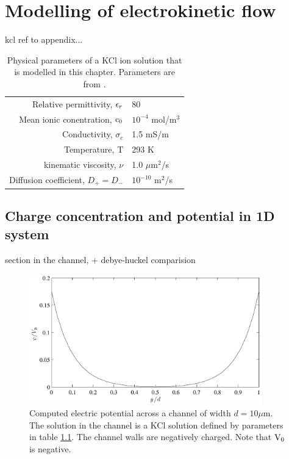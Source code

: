\chapter{Modelling of electrokinetic flow}
kcl ref to appendix...
\begin{table}
  \caption{Physical parameters of a KCl ion solution that is modelled
    in this chapter. Parameters are from \cite{dongquing-ren-book}. }
\begin{center}
    \begin{tabular}{ | r | l |}
    \hline
    Relative permittivity, $\epsilon_r$ & 80\\
    Mean ionic conentration, $\mathrm{c_0}$ & $10^{-4}$ mol/m$^3$\\
    Conductivity, $\sigma_c$ & 1.5 mS/m\\
    Temperature, T & 293 K\\
    kinematic viscosity, $\nu$ & 1.0 $\mu$m$^2$/s\\
    Diffusion coefficient, $D_+ = D_{-}$ & $ 10^{-10}$ m$^2$/s\\
    \hline
    \end{tabular}
\end{center}    
\label{tab:res:param}
\end{table}

\section{Charge concentration and potential in 1D system}
section in the channel, + debye-huckel comparision

\begin{figure}
\begin{center}
\includegraphics[width=0.9\textwidth]{fig/potential_1d.pdf}
\end{center}
\caption{Computed electric potential across a channel of width $d = 10
  \mu$m. The solution in the channel is a KCl solution defined by
  parameters in table \ref{tab:res:param}. The channel walls are
  negatively charged. Note that $\mathrm{V_0}$ is negative.}
\label{fig:res:pot_1d}
\end{figure}

